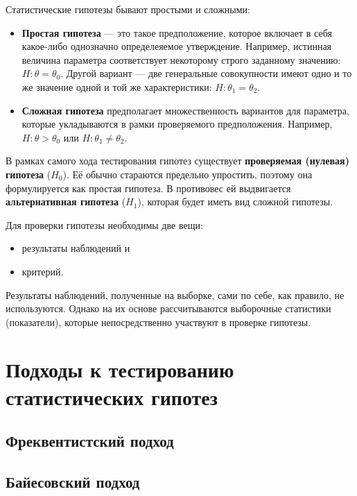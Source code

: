 \documentclass[
  letterpaper,
]{scrbook}
\providecommand{\tightlist}{%
  \setlength{\itemsep}{0pt}\setlength{\parskip}{0pt}}\usepackage{longtable,booktabs,array}
\theoremstyle{definition}
\theoremstyle{remark}
\begin{document}
Статистические гипотезы бывают простыми и сложными:

\begin{itemize}
\tightlist
\item
  \textbf{Простая гипотеза} --- это такое предположение, которое
  включает в себя какое-либо однозначно определеяемое утверждение.
  Например, истинная величина параметра соответствует некоторому строго
  заданному значению: \(H : \theta = \theta_0\). Другой вариант --- две
  генеральные совокупности имеют одно и то же значение одной и той же
  характеристики: \(H : \theta_1 = \theta_2\).
\item
  \textbf{Сложная гипотеза} предполагает множественность вариантов для
  параметра, которые укладываются в рамки проверяемого предположения.
  Например, \(H : \theta > \theta_0\) или
  \(H : \theta_1 \neq \theta_2\).
\end{itemize}

В рамках самого хода тестирования гипотез существует \textbf{проверяемая
(нулевая) гипотеза} (\(H_0\)). Её обычно стараются предельно упростить,
поэтому она формулируется как простая гипотеза. В противовес ей
выдвигается \textbf{альтернативная гипотеза} (\(H_1\)), которая будет
иметь вид сложной гипотезы.

Для проверки гипотезы необходимы две вещи:

\begin{itemize}
\tightlist
\item
  результаты наблюдений и
\item
  критерий.
\end{itemize}

Результаты наблюдений, полученные на выборке, сами по себе, как правило,
не используются. Однако на их основе рассчитываются выборочные
статистики (показатели), которые непосредственно участвуют в проверке
гипотезы.

\section{Подходы к тестированию статистических
гипотез}\label{stats-testing-approaches}

\subsection{Фреквентистский подход}\label{stats-testing-nhst}

\subsection{Байесовский подход}\label{stats-testing-bayes}
\end{document}
